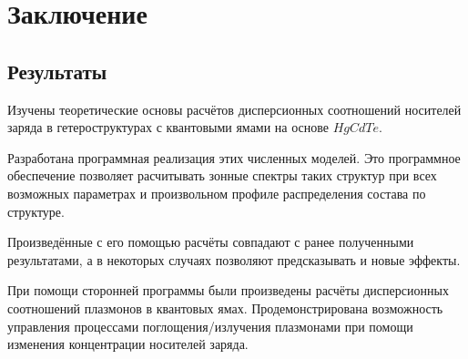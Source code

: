 \documentclass[../main.tex]{subfiles}
\begin{document}
\chapter{Заключение}

\section{Результаты}

    Изучены теоретические основы расчётов дисперсионных соотношений носителей заряда в
    гетероструктурах с квантовыми ямами на основе $HgCdTe$.

    Разработана программная реализация этих численных моделей.
    Это программное обеспечение позволяет расчитывать зонные спектры таких структур при 
    всех возможных параметрах и произвольном профиле распределения состава по структуре.

    Произведённые с его помощью расчёты совпадают с ранее полученными результатами, а 
    в некоторых случаях позволяют предсказывать и новые эффекты.
    
    При помощи сторонней программы были произведены расчёты дисперсионных соотношений 
    плазмонов в квантовых ямах. Продемонстрирована возможность управления процессами
    поглощения/излучения плазмонами при помощи изменения концентрации носителей 
    заряда.
\end{document}
